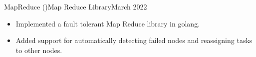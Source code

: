 \begin{cvsubsection}{MapReduce \normalfont(\href{ https://github.com/a3y3/MapReduce}{})}{Map Reduce Library}{March 2022}
	\begin{itemize}
        \item Implemented a fault tolerant Map Reduce library in golang.
        \item Added support for automatically detecting failed nodes and reassigning tasks to other nodes.
	\end{itemize}
\end{cvsubsection}